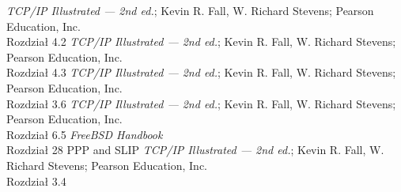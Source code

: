 \begin{thebibliography}{99}
    \emph{TCP/IP Illustrated --- 2nd ed.}; Kevin R. Fall, W. Richard Stevens; Pearson Education, Inc.\\
    Rozdział 4.2
    \emph{TCP/IP Illustrated --- 2nd ed.}; Kevin R. Fall, W. Richard Stevens; Pearson Education, Inc.\\
    Rozdział 4.3
    \emph{TCP/IP Illustrated --- 2nd ed.}; Kevin R. Fall, W. Richard Stevens; Pearson Education, Inc.\\
    Rozdział 3.6
    \emph{TCP/IP Illustrated --- 2nd ed.}; Kevin R. Fall, W. Richard Stevens; Pearson Education, Inc.\\
    Rozdział 6.5
    \emph{FreeBSD Handbook}\\
    Rozdział 28 PPP and SLIP
    \emph{TCP/IP Illustrated --- 2nd ed.}; Kevin R. Fall, W. Richard Stevens; Pearson Education, Inc.\\
    Rozdział 3.4
\end{thebibliography}
